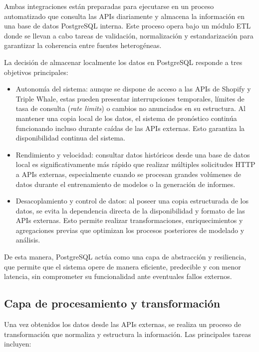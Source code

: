 Ambas integraciones están preparadas para ejecutarse en un proceso automatizado que consulta las APIs diariamente y almacena la información en una base de datos PostgreSQL \citep{postgresql_docs} interna. Este proceso opera bajo un módulo ETL \citep{microsoft_etl} donde se llevan a cabo tareas de validación, normalización y estandarización para garantizar la coherencia entre fuentes heterogéneas.

La decisión de almacenar localmente los datos en PostgreSQL responde a tres objetivos principales:

\begin{itemize}
    \item Autonomía del sistema: aunque se dispone de acceso a las APIs de Shopify y Triple Whale, estas pueden presentar interrupciones temporales, límites de tasa de consulta (\textit{rate limits}) o cambios no anunciados en su estructura. Al mantener una copia local de los datos, el sistema de pronóstico continúa funcionando incluso durante caídas de las APIs externas. Esto garantiza la disponibilidad continua del sistema.

    \item Rendimiento y velocidad: consultar datos históricos desde una base de datos local es significativamente más rápido que realizar múltiples solicitudes HTTP a APIs externas, especialmente cuando se procesan grandes volúmenes de datos durante el entrenamiento de modelos o la generación de informes.

    \item Desacoplamiento y control de datos: al poseer una copia estructurada de los datos, se evita la dependencia directa de la disponibilidad y formato de las APIs externas. Esto permite realizar transformaciones, enriquecimientos y agregaciones previas que optimizan los procesos posteriores de modelado y análisis.
\end{itemize}

De esta manera, PostgreSQL actúa como una capa de abstracción y resiliencia, que permite que el sistema opere de manera eficiente, predecible y con menor latencia, sin comprometer su funcionalidad ante eventuales fallos externos.

\subsection{Capa de procesamiento y transformación}

Una vez obtenidos los datos desde las APIs externas, se realiza un proceso de transformación que normaliza y estructura la información. Las principales tareas incluyen:

